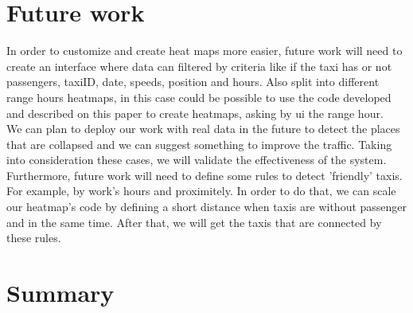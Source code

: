 \documentclass[11pt,conference,a4paper,twocolumns,romanappendices]{IEEEtran}
\begin{document}
\section{Future work}
In order to customize and create heat maps more easier, future work will need to create an interface where data can filtered by criteria like if the taxi has or not passengers, taxiID, date, speeds, position and hours. Also split into different range hours heatmaps, in this case could be possible to use the code developed and described on this paper to create heatmaps, asking by ui the range hour. \\
We can plan to deploy our work with real data in the future to detect the places that are collapsed and we can suggest something to improve the traffic. Taking into consideration these cases, we will validate the effectiveness of the system. \\
Furthermore, future work will need to define some rules to detect 'friendly' taxis. For example, by work's hours and proximitely. In order to do that, we can scale our heatmap's code by defining a short distance when taxis are without passenger and in the same time. After that, we will get the taxis that are connected by these rules.

\section{Summary}

\newpage


\end{document}
